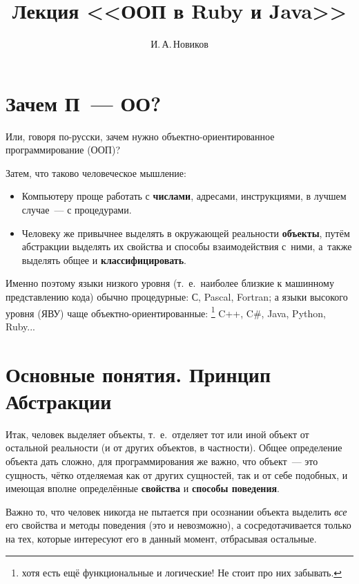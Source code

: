 \documentclass[a4paper, 14pt, titlepage]{extarticle}
\author{И.\,А.\,Новиков}
\title{Лекция <<ООП в Ruby и Java>>}
\newcommand{\strong}[1]{\textbf{#1}}
\newcommand{\ie}{т.~е.~}
\begin{document}

  \thispagestyle{empty}
  \maketitle

  \newpage

  \section{Зачем П~--- ОО?}

  Или, говоря по-русски, зачем нужно объектно-ориентированное программирование (ООП)?

  Затем, что таково человеческое мышление:
  \begin{itemize}
    \item Компьютеру проще работать с \strong{числами}, адресами, инструкциями, в лучшем случае~--- с процедурами.
    \item Человеку же привычнее выделять в окружающей реальности \strong{объекты}, путём абстракции
    выделять их свойства и способы взаимодействия с~ними, а~также выделять общее и
    \strong{классифицировать}.
  \end{itemize}

  Именно поэтому языки низкого уровня (\ie наиболее близкие к машинному представлению кода) обычно %
  процедурные: С, Pascal, Fortran; а языки высокого уровня (ЯВУ) чаще объектно-ориентированные:
  \footnote{хотя есть ещё функциональные и логические! Не стоит про них забывать.}
  C++, C\#, Java, Python, Ruby...

  \section{Основные понятия. Принцип Абстракции}

  Итак, человек выделяет объекты, \ie отделяет тот или иной объект от остальной реальности (и от
  других объектов, в частности). Общее определение объекта дать сложно, для программирования же
  важно, что объект~--- это сущность, чётко отделяемая как от других сущностей, так и от себе
  подобных, и имеющая вполне определённые \strong{свойства} и \strong{способы поведения}.

  Важно то, что человек никогда не пытается при осознании объекта выделить \emph{все} его свойства и
  методы поведения (это и невозможно), а сосредотачивается только на тех, которые интересуют его в
  данный момент, отбрасывая остальные.
\end{document}
